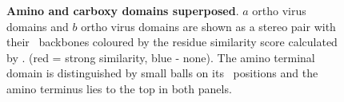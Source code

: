 \begin{figure}
\centering
{}
\begin{footnotesize}
\caption{
\label{Fig:final}
{\bf Amino and carboxy domains superposed}.
$a$ ortho virus domains and
$b$ ortho virus domains are shown as a stereo pair with
their \CA\ backbones coloured by
the residue similarity score calculated by \SAP. (red = strong similarity, blue - none).
The amino terminal domain is distinguished by small balls on its \CA\ positions and
the amino terminus lies to the top in both panels.
}
\end{footnotesize}
\end{figure}

